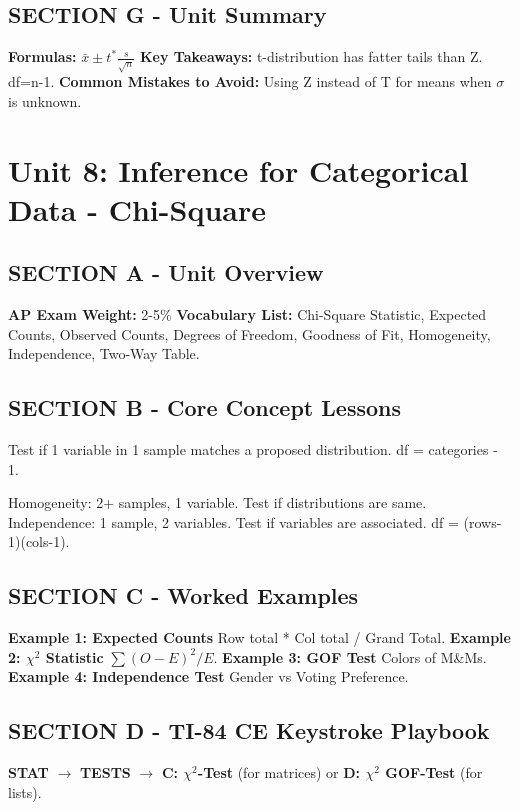 \section{SECTION G - Unit Summary}
\begin{lessonbox}
\textbf{Formulas:} $\bar{x} \pm t^* \frac{s}{\sqrt{n}}$
\textbf{Key Takeaways:} t-distribution has fatter tails than Z. df=n-1.
\textbf{Common Mistakes to Avoid:} Using Z instead of T for means when $\sigma$ is unknown.
\end{lessonbox}

\chapter{Unit 8: Inference for Categorical Data - Chi-Square}
\section{SECTION A - Unit Overview}
\textbf{AP Exam Weight:} 2-5\%
\textbf{Vocabulary List:} Chi-Square Statistic, Expected Counts, Observed Counts, Degrees of Freedom, Goodness of Fit, Homogeneity, Independence, Two-Way Table.

\section{SECTION B - Core Concept Lessons}
\begin{lessonbox}
Test if 1 variable in 1 sample matches a proposed distribution. df = categories - 1.
\end{lessonbox}
\begin{lessonbox}
Homogeneity: 2+ samples, 1 variable. Test if distributions are same.
Independence: 1 sample, 2 variables. Test if variables are associated. df = (rows-1)(cols-1).
\end{lessonbox}

\section{SECTION C - Worked Examples}
\textbf{Example 1: Expected Counts} Row total * Col total / Grand Total.
\textbf{Example 2: $\chi^2$ Statistic} $\sum (O-E)^2/E$.
\textbf{Example 3: GOF Test} Colors of M\&Ms.
\textbf{Example 4: Independence Test} Gender vs Voting Preference.

\section{SECTION D - TI-84 CE Keystroke Playbook}
\begin{calculatorbox}
\textbf{STAT} $\rightarrow$ \textbf{TESTS} $\rightarrow$ \textbf{C: $\chi^2$-Test} (for matrices) or \textbf{D: $\chi^2$ GOF-Test} (for lists).
\end{calculatorbox}

